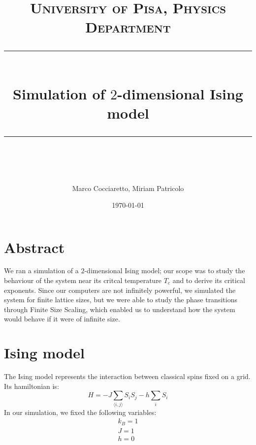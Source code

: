 \documentclass[11pt]{scrartcl} %
\title{	
	\normalfont\normalsize
	\textsc{University of Pisa, Physics Department}\\ %
	\vspace{25pt} %
	\rule{\linewidth}{0.5pt}\\ %
	\vspace{20pt} %
	{\huge Simulation of $2$-dimensional Ising model}\\ %
	\vspace{12pt} %
	\rule{\linewidth}{2pt}\\ %
	\vspace{12pt} %
}
\author{\LARGE Marco Cocciaretto,  \LARGE Miriam Patricolo} %
\date{\normalsize\today} %
\begin{document}
\maketitle

\section*{Abstract}
We ran a simulation of a $2$-dimensional Ising model; our scope was to study the behaviour of the system near its critcal temperature $T_c$ and to derive its critical exponents. Since our computers are not infinitely powerful, we simulated the system for finite lattice sizes, but we were able to study the phase transitions through Finite Size Scaling, which enabled us to understand how the system would behave if it were of infinite size.

\section{Ising model}
The Ising model represents the interaction between classical spins fixed on a grid. Its hamiltonian is:
\begin{equation}
	\label{ising}
	H = -J \sum _{\langle i,j \rangle} S_i S_j - h\sum_i S_i
\end{equation}
In our simulation, we fixed the following variables:
\begin{equation}
	\label{choice}
	\begin{array}{c}
		k_B = 1 \\
		J = 1 \\
		h = 0
	\end{array}
\end{equation}
\end{document}
